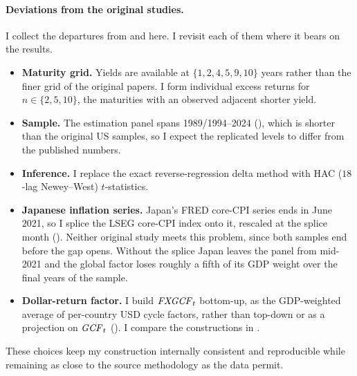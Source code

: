 \paragraph{Deviations from the original studies.}
\label{sec:meth-deviations}
I collect the departures from \citet{cieslak2015}
and \citet{dahlquist2013} here. I revisit each of them where it
bears on the results.
\begin{itemize}[leftmargin=1.4em]
  \item \textbf{Maturity grid.} Yields are available at $\{1,2,4,5,9,10\}$ years
    rather than the finer grid of the original papers. I form individual excess
    returns for $n\in\{2,5,10\}$, the maturities with an observed adjacent
    shorter yield.
  \item \textbf{Sample.} The estimation panel spans 1989/1994--2024
    (), which is shorter than the original US samples, so I expect the replicated levels to differ
    from the published numbers.
  \item \textbf{Inference.} I replace the exact reverse-regression delta method
    with HAC ($18$-lag Newey--West) $t$-statistics.
  \item \textbf{Japanese inflation series.} Japan's FRED core-CPI series ends in
    June 2021, so I splice the LSEG core-CPI index onto it, rescaled at the splice
    month (). Neither original study meets this problem, since both
    samples end before the gap opens. Without the splice Japan leaves the panel
    from mid-2021 and the global factor loses roughly a fifth of its GDP weight
    over the final years of the sample.
  \item \textbf{Dollar-return factor.} I build $\mathit{FXGCF}_{t}$ bottom-up, as the
    GDP-weighted average of per-country USD cycle factors, rather than
    top-down or as a projection on $\mathit{GCF}_{t}$ (). I
    compare the constructions in .
\end{itemize}
These choices keep my construction internally consistent and reproducible
while remaining as close to the source methodology as the data permit.
